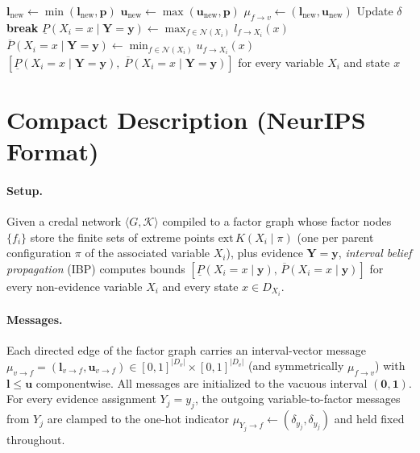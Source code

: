 \documentclass[11pt]{article}
\begin{document}
\begin{algorithm}[H]
\begin{algorithmic}[1]
        \State $\mathbf{l}_{\mathrm{new}} \gets \min(\mathbf{l}_{\mathrm{new}}, \mathbf{p})$
        \State $\mathbf{u}_{\mathrm{new}} \gets \max(\mathbf{u}_{\mathrm{new}}, \mathbf{p})$
      \EndFor
    \EndFor
    \State $\mu_{f \to v} \gets (\mathbf{l}_{\mathrm{new}}, \mathbf{u}_{\mathrm{new}})$
    \State Update $\delta$
  \EndFor
  \If{$\delta < \tau$} \textbf{break} \EndIf
\EndFor
\Statex
{}
    \State $\underline{P}(X_i{=}x \mid \mathbf{Y}{=}\mathbf{y}) \gets \max_{f \in \mathcal{N}(X_i)} l_{f \to X_i}(x)$
    \State $\overline{P}(X_i{=}x \mid \mathbf{Y}{=}\mathbf{y}) \gets \min_{f \in \mathcal{N}(X_i)} u_{f \to X_i}(x)$
  \EndFor
\EndFor
\State \Return $[\underline{P}(X_i{=}x \mid \mathbf{Y}{=}\mathbf{y}),\; \overline{P}(X_i{=}x \mid \mathbf{Y}{=}\mathbf{y})]$ for every variable $X_i$ and state $x$
\end{algorithmic}
\end{algorithm}

\section{Compact Description (NeurIPS Format)}\label{sec:compact}

\paragraph{Setup.}
Given a credal network $\langle G, \mathcal{K} \rangle$ compiled to a factor
graph whose factor nodes $\{f_i\}$ store the finite sets of extreme points
$\mathrm{ext}\,K(X_i \mid \pi)$ (one per parent configuration $\pi$ of the
associated variable $X_i$), plus evidence $\mathbf{Y} = \mathbf{y}$, \emph{interval
belief propagation} (IBP) computes bounds
$[\underline{P}(X_i{=}x \mid \mathbf{y}),\, \overline{P}(X_i{=}x \mid \mathbf{y})]$
for every non-evidence variable $X_i$ and every state $x \in D_{X_i}$.

\paragraph{Messages.}
Each directed edge of the factor graph carries an interval-vector message
$\mu_{v \to f} = (\mathbf{l}_{v \to f}, \mathbf{u}_{v \to f}) \in
[0,1]^{|D_v|} \times [0,1]^{|D_v|}$ (and symmetrically $\mu_{f \to v}$) with
$\mathbf{l} \le \mathbf{u}$ componentwise. All messages are initialized to the
vacuous interval $(\mathbf{0}, \mathbf{1})$. For every evidence assignment
$Y_j = y_j$, the outgoing variable-to-factor messages from $Y_j$ are clamped to
the one-hot indicator
$\mu_{Y_j \to f} \gets (\delta_{y_j}, \delta_{y_j})$ and held fixed throughout.
\end{document}
